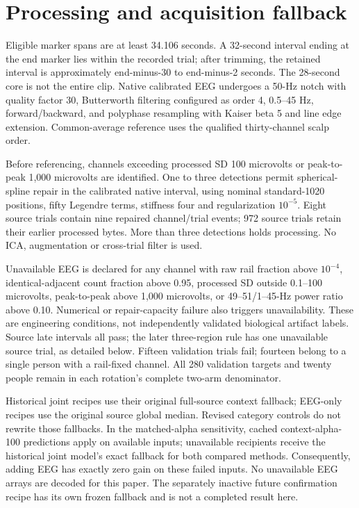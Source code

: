 \documentclass[10pt,a4paper]{article}
\begin{document}
\section{Processing and acquisition fallback}
Eligible marker spans are at least 34.106 seconds. A 32-second interval ending at the end marker lies within the recorded trial; after trimming, the retained interval is approximately end-minus-30 to end-minus-2 seconds. The 28-second core is not the entire clip. Native calibrated EEG undergoes a 50-Hz notch with quality factor 30, Butterworth filtering configured as order 4, 0.5--45 Hz, forward/backward, and polyphase resampling with Kaiser beta 5 and line edge extension. Common-average reference uses the qualified thirty-channel scalp order.

Before referencing, channels exceeding processed SD 100 microvolts or peak-to-peak 1,000 microvolts are identified. One to three detections permit spherical-spline repair in the calibrated native interval, using nominal standard-1020 positions, fifty Legendre terms, stiffness four and regularization \(10^{-5}\). Eight source trials contain nine repaired channel/trial events; 972 source trials retain their earlier processed bytes. More than three detections holds processing. No ICA, augmentation or cross-trial filter is used.

Unavailable EEG is declared for any channel with raw rail fraction above \(10^{-4}\), identical-adjacent count fraction above 0.95, processed SD outside 0.1--100 microvolts, peak-to-peak above 1,000 microvolts, or 49--51/1--45-Hz power ratio above 0.10. Numerical or repair-capacity failure also triggers unavailability. These are engineering conditions, not independently validated biological artifact labels. Source late intervals all pass; the later three-region rule has one unavailable source trial, as detailed below. Fifteen validation trials fail; fourteen belong to a single person with a rail-fixed channel. All 280 validation targets and twenty people remain in each rotation's complete two-arm denominator.

Historical joint recipes use their original full-source context fallback; EEG-only recipes use the original source global median. Revised category controls do not rewrite those fallbacks. In the matched-alpha sensitivity, cached context-alpha-100 predictions apply on available inputs; unavailable recipients receive the historical joint model's exact fallback for both compared methods. Consequently, adding EEG has exactly zero gain on these failed inputs. No unavailable EEG arrays are decoded for this paper. The separately inactive future confirmation recipe has its own frozen fallback and is not a completed result here.
\end{document}
